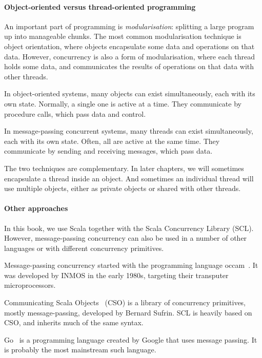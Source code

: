\paragraph{Object-oriented versus thread-oriented programming}

An important part of programming is \emph{modularisation}: splitting a large
program up into manageable chunks.  The most common modularisation technique
is object orientation, where objects encapsulate some data and operations on
that data.  However, concurrency is also a form of modularisation, where each
thread holds some data, and communicates the results of operations on that
data with other threads.

In object-oriented systems, many objects can exist simultaneously, each with
its own state.  Normally, a single one is active at a time.  They communicate
by procedure calls, which pass data and control.

In message-passing concurrent systems, many threads can exist simultaneously,
each with its own state.  Often, all are active at the same time.  They
communicate by sending and receiving messages, which pass data.

The two techniques are complementary.  In later chapters, we will sometimes
encapsulate a thread inside an object.  And sometimes an individual thread
will use multiple objects, either as private objects or shared with other
threads. 


\paragraph{Other approaches}

In this book, we use Scala together with the Scala Concurrency Library (SCL).
However, message-passing concurrency can also be used in a number of other
languages or with different concurrency primitives.

Message-passing concurrency started with the programming language {\sf
  occam}~\cite{occam}.  It was developed by INMOS in the early 1980s,
targeting their transputer microprocessors.

Communicating Scala Objects~\cite{CSO} (CSO) is a library of concurrency
primitives, mostly message-passing, developed by Bernard Sufrin.  SCL is
heavily based on CSO, and inherits much of the same syntax.

Go~\cite{go} is a programming language created by Google that uses message
passing.  It is probably the most mainstream such language.


